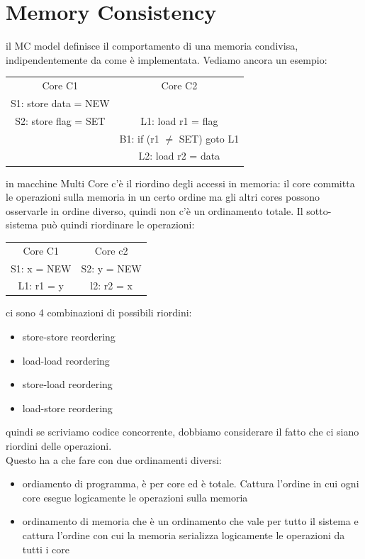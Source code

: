 \documentclass[12pt, oneside]{extbook} %
\begin{document}
\section{Memory Consistency}
il MC model definisce il comportamento di una memoria condivisa, indipendentemente da come è implementata. Vediamo ancora un esempio:
\begin{table}[!h]
	\begin{tabular}{|c|c|}
		Core C1 & Core C2\\
		S1: store data = NEW & \\
		S2: store flag = SET & L1: load r1 = flag\\
		 & B1: if (r1 $\neq$ SET) goto L1\\
		 & L2: load r2 = data\\
	\end{tabular}
\end{table}
in macchine Multi Core c'è il riordino degli accessi in memoria: il core committa le operazioni sulla memoria in un certo ordine ma gli altri cores possono osservarle in ordine diverso, quindi non c'è un ordinamento totale. Il sotto-sistema può quindi riordinare le operazioni: 
\begin{table}[!h]
	\begin{tabular}{|c|c|}
		Core C1 & Core c2\\
		S1: x = NEW & S2: y = NEW\\
		L1: r1 = y & l2: r2 = x\\
	\end{tabular}
\end{table}
ci sono 4 combinazioni di possibili riordini:
\begin{itemize}
	\item store-store reordering
	\item load-load reordering
	\item store-load reordering
	\item load-store reordering
\end{itemize}
quindi se scriviamo codice concorrente, dobbiamo considerare il fatto che ci siano riordini delle operazioni.\\ Questo ha a che fare con due ordinamenti diversi:
\begin{itemize}
\item ordiamento di programma, è per core ed è totale. Cattura l'ordine in cui ogni core esegue logicamente le operazioni sulla memoria 
\item ordinamento di memoria che è un ordinamento che vale per tutto il sistema e cattura l'ordine con cui la memoria serializza logicamente le operazioni da tutti i core
\end{itemize}
\end{document}
